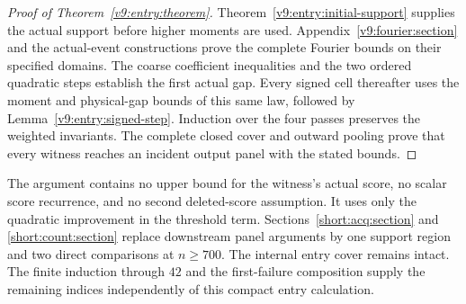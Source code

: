 \begin{proof}[Proof of Theorem~\ref{v9:entry:theorem}]
Theorem~\ref{v9:entry:initial-support} supplies the actual support before
higher moments are used. Appendix~\ref{v9:fourier:section} and the
actual-event constructions prove the complete Fourier bounds on their
specified domains. The coarse coefficient inequalities and the two
ordered quadratic steps establish the first actual gap. Every signed
cell thereafter uses the moment and physical-gap bounds of this same
law, followed by Lemma~\ref{v9:entry:signed-step}. Induction over the
four passes preserves the weighted invariants. The complete closed
cover and outward pooling prove that every witness reaches an incident
output panel with the stated bounds.
\end{proof}
The argument contains no upper bound for the witness's actual score,
no scalar score recurrence, and no second deleted-score assumption.
It uses only the quadratic improvement in the threshold term.
Sections~\ref{short:acq:section} and \ref{short:count:section} replace
downstream panel arguments by one support region and two direct
comparisons at $n\ge700$. The internal entry cover
remains intact. The finite induction through $42$ and the first-failure
composition supply the remaining indices independently of this compact
entry calculation.

